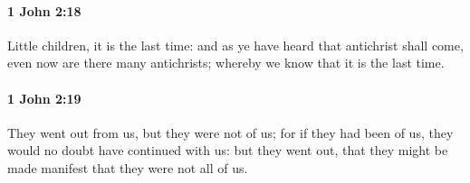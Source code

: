 		\paragraph{1 John 2:18} %
			\label{1JOHN-2-18}

			Little children, it is the last time: and as ye have heard that antichrist shall come, even now are there many antichrists; whereby we know that it is the last time.

			\begin{framed}
			\scriptsize
				\begin{compactdesc}
					\item[SBLG] 
				\end{compactdesc}
			\end{framed}

		\paragraph{1 John 2:19} %
			\label{1JOHN-2-19}

			They went out from us, but they were not of us; for if they had been of us, they would no doubt have continued with us: but they went out, that they might be made manifest that they were not all of us.

